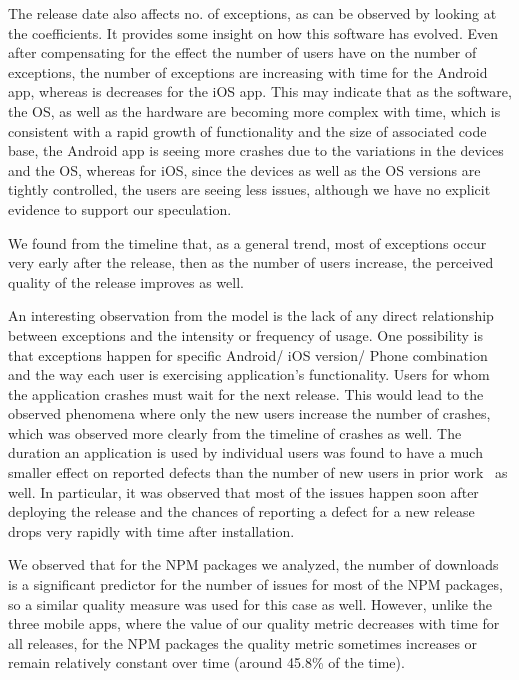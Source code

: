 \documentclass[smallextended]{svjour3}       %
\begin{document}
The release date also affects no. of exceptions, as can be observed by looking 
at the coefficients. It provides some insight on
how this software has evolved.  
Even after compensating for the effect the number of
users have on the number of exceptions, the number of exceptions are
increasing with time for the Android app, whereas is decreases for the iOS app. 
This may indicate that as the software, the OS, as well as the hardware are becoming 
more complex with time, which is consistent with a rapid growth of
functionality and the size of associated code base, the Android app is seeing more crashes due to the variations in the devices and the OS, whereas for iOS, since the devices as well as the OS versions are tightly controlled, the users are seeing less issues,   although we have no explicit evidence to support our speculation. 

We found from the timeline that, as a general trend, most of exceptions occur very early after the release, then as the number of users increase, the perceived quality of the release improves as well.


An interesting observation from the model is the lack of any direct relationship 
between exceptions and the intensity or frequency of usage.
One possibility is that exceptions happen for specific Android/
iOS version/ Phone combination and the way each user is exercising application's
functionality. Users for whom the application crashes must wait for
the next release. This would lead to the observed phenomena where
only the new users increase the number of crashes, which was observed more 
clearly from the timeline of crashes as well. The duration 
an application is used by individual users was found to have a much
smaller effect on reported defects than the number of
new users in prior work~\cite{hmps15,IQ08,MZL05} as well. In particular, it was observed
that most of the issues happen soon after deploying the release 
and the chances of reporting a defect for a new release drops 
very rapidly with time after installation.

We observed that for the NPM packages we analyzed, the number of downloads is a significant predictor for the number of issues for  most of the NPM packages, so a similar quality measure was used for this case as well. 
However, unlike the three mobile apps, where the value of our quality metric decreases with time for all releases, for the NPM packages the quality metric sometimes increases or remain relatively constant over time (around 45.8\% of the time). 
\end{document}
